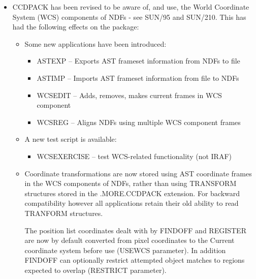 \documentclass[twoside,11pt]{article}
\newcommand{\htmlref}[2]{#1}
\newcommand{\xref}[3]{#1}
\renewcommand{\_}{\texttt{\symbol{95}}}
\newcommand{\xroutine}[1]{\htmlref{{\sc #1}}{#1}}
\begin{document}
\begin{itemize}
\item
    CCDPACK has been revised to be aware of, and use, the World Coordinate
    System (WCS) components of NDFs - see 
    \xref{SUN/95}{sun95}{se_wcsuse} and \xref{SUN/210}{sun210}{}.
    This has had the following effects on  the package:
    \begin{itemize}
    \item 
    Some new applications have been introduced:
       \begin{itemize}
       \item \xroutine{ASTEXP} --
             Exports AST frameset information from NDFs to file
       \item \xroutine{ASTIMP} --
             Imports AST frameset information from file to NDFs
       \item \xroutine{WCSEDIT} --
             Adds, removes, makes current frames in WCS component
       \item \xroutine{WCSREG} --
             Aligns NDFs using multiple WCS component frames
       \end{itemize}
    \item
    A new test script is available:
       \begin{itemize}
       \item WCSEXERCISE --
             test WCS-related functionality (not IRAF)
       \end{itemize}

    \item
    Coordinate transformations are now stored using AST coordinate
    frames in the WCS components of NDFs, rather than using 
    TRANSFORM structures stored in the .MORE.CCDPACK extension.
    For backward compatibility however all applications retain their 
    old ability to read TRANFORM structures.

    The position list coordinates dealt with by FINDOFF and 
    REGISTER are now by default converted from pixel coordinates to
    the Current coordinate system before use (USEWCS parameter).  
    In addition FINDOFF can optionally restrict attempted object
    matches to regions expected to overlap (RESTRICT parameter).


\end{itemize}
\end{itemize}
\end{document}
